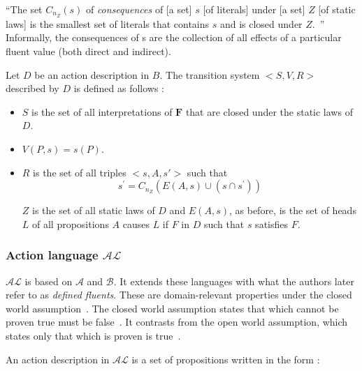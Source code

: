 \begin{definition}
    ``The set $C_{n_Z}\left(s\right)$ of \textit{consequences} of [a set] $s$ [of literals] under [a set] $Z$ [of static laws] is the smallest set of literals that contains $s$ and is closed under $Z$.~\cite{gelfond_action_1998}''
    Informally, the consequences of s are the collection of all effects of a particular fluent value (both direct and indirect).
\end{definition}

\begin{definition}

    Let $D$ be an action description in $B$.
    The transition system $< S, V, R >$ described by $D$ is defined as follows \cite{gelfond_action_1998}:

    \begin{itemize}
        \item $S$ is the set of all interpretations of $\boldsymbol{F}$ that are closed under the static laws of $D$.
        \item $V(P, s)=s(P)$.
        \item $R$ is the set of all triples $<s, A, s\prime>$ such that
            $$
            s^\prime=C_{n_Z}\left(E\left(A,s\right)\cup\left(s \cap s^\prime\right)\right)
            $$

            $ Z $ is the set of all static laws of $D$ and $E(A, s)$, as before, is the set of heads $L$ of all propositions $A$ causes $L$ if $F$ in $D$ such that $s$ satisfies $F$.
    \end{itemize}
\end{definition}

\subsubsection{Action language $ \mathcal{AL} $}
\label{subsubsec:action_language_al}

$ \mathcal{AL} $ is based on $ \mathcal{A} $ and $ \mathcal{B} $.
It extends these languages with what the authors later refer to as \textit{defined fluents}.
These are domain-relevant properties under the closed world assumption~\cite{blount_architecture_2013}.
The closed world assumption states that which cannot be proven true must be false~\cite{reiter_closed_1981}.
It contrasts from the open world assumption, which states only that which is proven is true~\cite{reiter_closed_1981}.

An action description in $ \mathcal{AL} $ is a set of propositions written in the form \cite{baral_reasoning_2000, blount_architecture_2013}:

